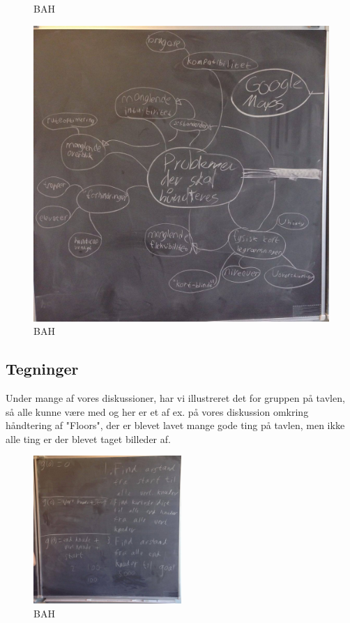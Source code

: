 \documentclass[a4paper,12pt,twoside,openright]{memoir}
\begin{document}
\begin{figure}
\begin{minipage}{0.45\textwidth}
                \caption{BAH}
                \label{4}
            \end{minipage}
            \begin{minipage}{0.45\textwidth}
                \centering
                \includegraphics[width=\textwidth]{Images/7.jpg}
                \caption{BAH}
                \label{4}
            \end{minipage}
        \end{figure}

        \subsection{Tegninger}
        Under mange af vores diskussioner, har vi illustreret det for gruppen på tavlen, så alle kunne være  med og her er et af ex. på vores diskussion omkring håndtering af "Floors", der er blevet lavet mange gode ting på tavlen, men ikke alle ting er der blevet taget billeder af.

        \begin{figure}[ht!]
            \centering
            \includegraphics[width=0.5\textwidth]{Images/5.jpg}
            \caption{BAH}
            \label{4}
        \end{figure}
\end{document}
